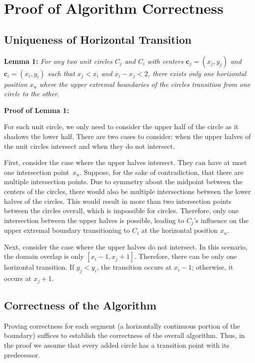 \documentclass[12pt]{article}
\newcommand{\myvector}[1]{{\boldsymbol{\mathbf{ #1 }}}}
\begin{document}
\section{Proof of Algorithm Correctness}

\subsection*{Uniqueness of Horizontal Transition}

\textbf{Lemma 1:} \emph{For any two unit circles \( C_j \) and \( C_i \) with centers \( \myvector{c}_j = (x_j, y_j) \) and \( \myvector{c}_i = (x_i, y_i) \) such that \( x_j < x_i \) and \( x_i - x_j < 2 \), there exists only one horizontal position \( x_u \) where the upper extremal boundaries of the circles transition from one circle to the other.}

\textbf{Proof of Lemma 1:}

For each unit circle, we only need to consider the upper half of the circle as it shadows the lower half. There are two cases to consider: when the upper halves of the unit circles intersect and when they do not intersect.

First, consider the case where the upper halves intersect. They can have at most one intersection point~\( x_u \). Suppose, for the sake of contradiction, that there are multiple intersection points. Due to symmetry about the midpoint between the centers of the circles, there would also be multiple intersections between the lower halves of the circles. This would result in more than two intersection points between the circles overall, which is impossible for circles. Therefore, only one intersection between the upper halves is possible, leading to \( C_j \)'s influence on the upper extremal boundary transitioning to \( C_i \) at the horizontal position \( x_u \).

Next, consider the case where the upper halves do not intersect. In this scenario, the domain overlap is only \( [x_i - 1, x_j + 1] \). Therefore, there can be only one horizontal transition. If \( y_j < y_i \), the transition occurs at \( x_i - 1 \); otherwise, it occurs at \( x_j + 1 \).

\subsection*{Correctness of the Algorithm}

Proving correctness for each segment (a horizontally continuous portion of the boundary) suffices to establish the correctness of the overall algorithm. Thus, in the proof we assume that every added circle has a transition point with its predecessor.
\end{document}
